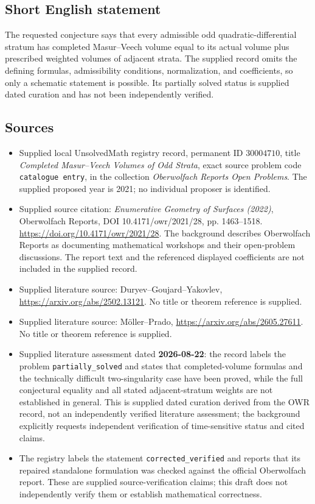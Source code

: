 \documentclass[11pt]{article}
\begin{document}
\subsection{Short English statement}
The requested conjecture says that every admissible odd quadratic-differential stratum has completed Masur--Veech volume equal to its actual volume plus prescribed weighted volumes of adjacent strata. The supplied record omits the defining formulas, admissibility conditions, normalization, and coefficients, so only a schematic statement is possible. Its partially solved status is supplied dated curation and has not been independently verified.
\subsection{Sources}
\begin{itemize}
\item Supplied local UnsolvedMath registry record, permanent ID \(30004710\), title \emph{Completed Masur--Veech Volumes of Odd Strata}, exact source problem code \texttt{catalogue entry}, in the collection \emph{Oberwolfach Reports Open Problems}. The supplied proposed year is 2021; no individual proposer is identified.
\item Supplied source citation: \emph{Enumerative Geometry of Surfaces (2022)}, Oberwolfach Reports, DOI 10.4171/owr/2021/28, pp. 1463--1518. \url{https://doi.org/10.4171/owr/2021/28}. The background describes Oberwolfach Reports as documenting mathematical workshops and their open-problem discussions. The report text and the referenced displayed coefficients are not included in the supplied record.
\item Supplied literature source: Duryev--Goujard--Yakovlev, \url{https://arxiv.org/abs/2502.13121}. No title or theorem reference is supplied.
\item Supplied literature source: M\"oller--Prado, \url{https://arxiv.org/abs/2605.27611}. No title or theorem reference is supplied.
\item Supplied literature assessment dated \textbf{2026-08-22}: the record labels the problem \texttt{partially\_solved} and states that completed-volume formulas and the technically difficult two-singularity case have been proved, while the full conjectural equality and all stated adjacent-stratum weights are not established in general. This is supplied dated curation derived from the OWR record, not an independently verified literature assessment; the background explicitly requests independent verification of time-sensitive status and cited claims.
\item The registry labels the statement \texttt{corrected\_verified} and reports that its repaired standalone formulation was checked against the official Oberwolfach report. These are supplied source-verification claims; this draft does not independently verify them or establish mathematical correctness.
\end{itemize}
\end{document}
